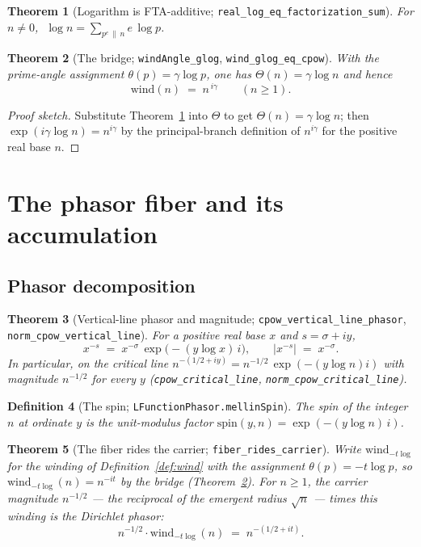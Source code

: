 \documentclass[11pt]{article}
\newtheorem{definition}{Definition}[section]
\newtheorem{theorem}[definition]{Theorem}
\newcommand{\code}[1]{\texttt{#1}}
\begin{document}
\begin{theorem}[Logarithm is FTA-additive; \code{real\_log\_eq\_factorization\_sum}]\label{thm:logfta}
For $n\neq 0$, $\;\log n=\sum_{p^{e}\,\|\,n} e\,\log p$.
\end{theorem}

\begin{theorem}[The bridge; \code{windAngle\_glog}, \code{wind\_glog\_eq\_cpow}]\label{thm:bridge}
With the prime-angle assignment $\theta(p)=\gamma\log p$, one has
$\Theta(n)=\gamma\log n$ and hence
\[
  \mathrm{wind}(n) \;=\; n^{\,i\gamma}\qquad(n\ge 1).
\]
\end{theorem}

\begin{proof}[Proof sketch]
Substitute Theorem~\ref{thm:logfta} into $\Theta$ to get $\Theta(n)=\gamma\log n$; then
$\exp(i\gamma\log n)=n^{i\gamma}$ by the principal-branch definition of $n^{i\gamma}$ for the
positive real base $n$.
\end{proof}

\section{The phasor fiber and its accumulation}\label{sec:fiber}

\subsection{Phasor decomposition}

\begin{theorem}[Vertical-line phasor and magnitude; \code{cpow\_vertical\_line\_phasor}, \code{norm\_cpow\_vertical\_line}]\label{thm:phasor}
For a positive real base $x$ and $s=\sigma+iy$,
\[
  x^{-s} \;=\; x^{-\sigma}\,\exp\!\bigl(-(y\log x)\,i\bigr),\qquad
  \bigl|x^{-s}\bigr| \;=\; x^{-\sigma}.
\]
In particular, on the critical line $n^{-(1/2+iy)}=n^{-1/2}\,\exp(-(y\log n)i)$ with magnitude
$n^{-1/2}$ for every $y$ (\code{cpow\_critical\_line}, \code{norm\_cpow\_critical\_line}).
\end{theorem}

\begin{definition}[The spin; \code{LFunctionPhasor.mellinSpin}]\label{def:spin}
The \emph{spin} of the integer $n$ at ordinate $y$ is the unit-modulus factor
$\mathrm{spin}(y,n)=\exp(-(y\log n)\,i)$.
\end{definition}

\begin{theorem}[The fiber rides the carrier; \code{fiber\_rides\_carrier}]\label{thm:rides}
Write $\mathrm{wind}_{-t\log}$ for the winding of Definition~\ref{def:wind} with the assignment
$\theta(p)=-t\log p$, so $\mathrm{wind}_{-t\log}(n)=n^{-it}$ by the bridge (Theorem~\ref{thm:bridge}).
For $n\ge 1$, the carrier magnitude $n^{-1/2}$ --- the reciprocal of the emergent radius $\sqrt n$ ---
times this winding is the Dirichlet phasor:
\[
  n^{-1/2}\cdot\mathrm{wind}_{-t\log}(n) \;=\; n^{-(1/2+it)} .
\]
\end{theorem}
\end{document}
